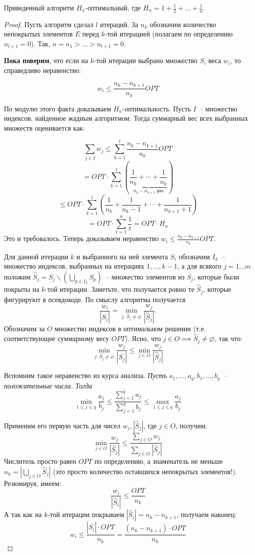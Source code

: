 \begin{theorem*}
    Приведенный алгоритм $H_n$-оптимальный, где $H_n = 1 + \frac{1}{2} + \ldots + \frac{1}{n}$.
\end{theorem*}
\begin{proof}
    Пусть алгоритм сделал $l$ итераций. За $n_k$ обозначим количество непокрытых элементов $E$ перед $k$-той итерацией (полагаем по определению $n_{l+1}=0$). Так, $n = n_1 > \ldots > n_{l+1} = 0$.

    \textbf{Пока поверим}, что если на $k$-той итерации выбрано множество $S_i$ веса $w_i$, то справедливо неравенство:

    $$w_i \leq \frac{n_k - n_{k+1}}{n_k}OPT$$

    По модулю этого факта доказываем $H_n$-оптимальность. Пусть $I$~-- множество индексов, найденное жадным алгоритмом. Тогда суммарный вес всех выбранных множеств оценивается как:

    $$\sum_{j\in I}w_j \leq \sum_{k=1}^l\frac{n_k-n_{k+1}}{n_k} OPT$$
    $$ = OPT\cdot\sum_{k=1}^l\left(\underbrace{\frac{1}{n_k} + \cdots + \frac{1}{n_k}}_{n_k-n_{k+1}\text{ раз}}\right)$$
    $$ \leq OPT \cdot\sum_{k=1}^l\left(\frac{1}{n_k} + \frac{1}{n_k - 1} + \cdots + \frac{1}{n_{k+1}+1}\right)$$
	$$ = OPT\cdot\sum_{t=1}^n\frac{1}{t} = OPT\cdot H_n$$
    Это и требовалось. Теперь доказываем неравенство $w_i \leq \frac{n_k - n_{k+1}}{n_k}OPT$.

    Для данной итерации $k$ и выбранного на ней элемента $S_i$ обозначим $I_k$~-- множество индексов, выбранных на итерациях $1, \ldots, k-1$, а для всякого $j=1\ldots m$ положим $\hat{S}_j = S_j \smallsetminus\left( \bigcup_{p \in I_k}S_p\right)$~-- множество элементов из $S_j$, которые были покрыты на $k$-той итерации. Заметьте, что получается ровно те $\hat{S}_j$, которые фигурируют в псевдокоде. По смыслу алгоритма получается $$\frac{w_i}{|\hat{S}_i|} = \min_{j:\, \hat{S}_j\neq\varnothing} \frac{w_j}{|\hat{S}_j|}.$$
    Обозначим за $O$ множество индексов в оптимальном решении (т.е. соответствующее суммарному весу $OPT$). Ясно, что $j \in O \implies \hat{S}_j \neq\varnothing$, так что: $$\min_{j:\, \hat{S}_j\neq\varnothing} \frac{w_j}{|\hat{S}_j|} \leq \min_{j \in O} \frac{w_j}{|\hat{S}_j|}$$

    Вспомним такое неравенство из курса анализа. \textit{Пусть $a_1, \ldots, a_q, b_1, \ldots, b_q$~-- положительные числа. Тогда}
    $$\min_{1\le j\le q} \frac{a_j}{b_j} \leq \frac{\sum\limits_{j=1}^q a_j}{\sum\limits_{j=1}^q b_j} \leq \max_{1\le j\le q} \frac{a_j}{b_j}$$

    Применим его первую часть для чисел $w_j, |\hat{S}_j|$, где $j \in O$, получим:
    $$\min_{j\in O} \frac{w_j}{\left|\hat{S}_j\right|} \leq \frac{\sum\limits_{j \in O} w_j}{\sum\limits_{j \in O} |\hat{S}_j|}$$
    Числитель просто равен $OPT$ по определению, а знаменатель не меньше $n_k = \left|\bigcup_{j \in O} \hat{S}_j\right|$ (это просто количество оставшихся непокрытых элементов!). Резюмируя, имеем: $$\frac{w_i}{|\hat{S}_i|} \leq \frac{OPT}{n_k}$$
    А так как на $k$-той итерации покрываем $|\hat{S}_i| = n_k - n_{k+1}$, получаем наконец:
    $$w_i \leq \frac{|\hat{S}_i|\cdot OPT}{n_k} = \frac{(n_k-n_{k+1})\cdot OPT}{n_k}$$

\end{proof}
